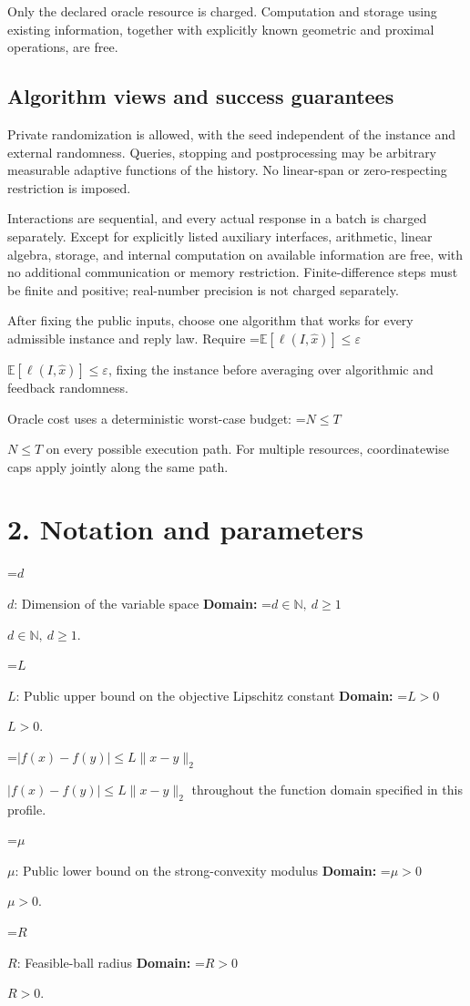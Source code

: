 \documentclass[10pt,a4paper]{article}
\newcommand{\AtlasMath}[1]{\par\begingroup\centering\setbox0=\hbox{$\displaystyle #1$}\ifdim\wd0>1.4\linewidth\typeout{ATLAS WIDE FORMULA: \the\wd0}\fi\ifdim\wd0>\linewidth\resizebox{\linewidth}{!}{\box0}\else\box0\fi\par\endgroup}
\newcommand{\AtlasInlineMath}[1]{\begingroup\setbox0=\hbox{$#1$}\ifdim\wd0>.4\linewidth\endgroup\AtlasMath{#1}\else\endgroup$#1$\fi}
\begin{document}
Only the declared oracle resource is charged. Computation and storage using existing information, together with explicitly known geometric and proximal operations, are free.

\subsection{Algorithm views and success guarantees}
Private randomization is allowed, with the seed independent of the instance and external randomness. Queries, stopping and postprocessing may be arbitrary measurable adaptive functions of the history. No linear-span or zero-respecting restriction is imposed.

Interactions are sequential, and every actual response in a batch is charged separately. Except for explicitly listed auxiliary interfaces, arithmetic, linear algebra, storage, and internal computation on available information are free, with no additional communication or memory restriction. Finite-difference steps must be finite and positive; real-number precision is not charged separately.

After fixing the public inputs, choose one algorithm that works for every admissible instance and reply law. Require \AtlasInlineMath{\mathbb{E}[\ell(I,\widehat{x})]\le \varepsilon}, fixing the instance before averaging over algorithmic and feedback randomness.

Oracle cost uses a deterministic worst-case budget: \AtlasInlineMath{N\le T} on every possible execution path. For multiple resources, coordinatewise caps apply jointly along the same path.

\section{2. Notation and parameters}
\AtlasInlineMath{d}: Dimension of the variable space \textbf{Domain:} \AtlasInlineMath{d\in\mathbb{N},\ d\ge1}.

\AtlasInlineMath{L}: Public upper bound on the objective Lipschitz constant \textbf{Domain:} \AtlasInlineMath{L>0}.

\AtlasInlineMath{|f(x)-f(y)|\le L\|x-y\|_2} throughout the function domain specified in this profile.

\AtlasInlineMath{\mu}: Public lower bound on the strong-convexity modulus \textbf{Domain:} \AtlasInlineMath{\mu>0}.

\AtlasInlineMath{R}: Feasible-ball radius \textbf{Domain:} \AtlasInlineMath{R>0}.
\end{document}
